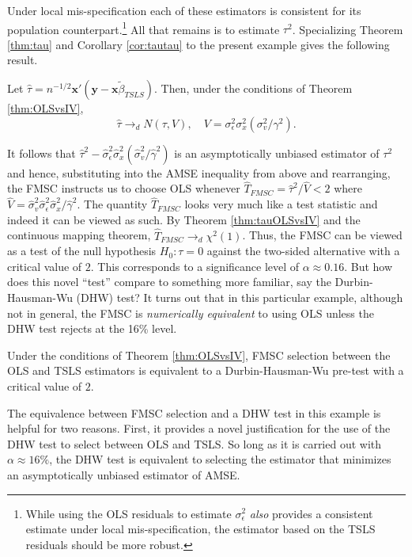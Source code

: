 Under local mis-specification each of these estimators is consistent for its population counterpart.\footnote{While using the OLS residuals to estimate $\sigma_\epsilon^2$ \emph{also} provides a consistent estimate under local mis-specification, the estimator based on the TSLS residuals should be more robust.} 
All that remains is to estimate $\tau^2$. Specializing Theorem \ref{thm:tau} and Corollary \ref{cor:tautau} to the present example gives the following result.
\begin{thm}
	\label{thm:tauOLSvsIV}
	Let $\widehat{\tau} =  n^{-1/2} \mathbf{x}'(\mathbf{y} - \mathbf{x}\widetilde{\beta}_{TSLS})$. Then, under the conditions of Theorem \ref{thm:OLSvsIV},
	$$\widehat{\tau}\rightarrow_d N(\tau,V), \quad V = \sigma_\epsilon^2 \sigma_x^2(\sigma_v^2/\gamma^2).$$ 
\end{thm}
It follows that $\widehat{\tau}^2 -  \widehat{\sigma}_\epsilon^2\widehat{\sigma}_x^2 \left(\widehat{\sigma}_v^2/\widehat{\gamma}^2\right)$ is an asymptotically unbiased estimator of $\tau^2$ and hence, substituting into the AMSE inequality from above and rearranging, the FMSC instructs us to choose OLS whenever $\widehat{T}_{FMSC} = \widehat{\tau}^2/\widehat{V} < 2$
where $\widehat{V} = \widehat{\sigma}_v^2 \widehat{\sigma}_\epsilon^2 \widehat{\sigma}_x^2/\widehat{\gamma}^2$. 
The quantity $\widehat{T}_{FMSC}$ looks very much like a test statistic and indeed it can be viewed as such. 
By Theorem \ref{thm:tauOLSvsIV} and the continuous mapping theorem, $\widehat{T}_{FMSC} \rightarrow_d \chi^2(1)$. 
Thus, the FMSC can be viewed as a test of the null hypothesis $H_0\colon \tau = 0$ against the two-sided alternative with a critical value of $2$. 
This corresponds to a significance level of $\alpha \approx 0.16$. 
But how does this novel ``test'' compare to something more familiar, say the Durbin-Hausman-Wu (DHW) test? 
It turns out that in this particular example, although not in general, the FMSC is \emph{numerically equivalent} to using OLS unless the DHW test rejects at the 16\% level. 
\begin{thm}
    \label{thm:DHW} Under the conditions of Theorem \ref{thm:OLSvsIV}, FMSC selection between the OLS and TSLS estimators is equivalent to a Durbin-Hausman-Wu pre-test with a critical value of $2$.
\end{thm}
The equivalence between FMSC selection and a DHW test in this example is helpful for two reasons. 
First, it provides a novel justification for the use of the DHW test to select between OLS and TSLS. So long as it is carried out with $\alpha \approx 16\%$, the DHW test is equivalent to selecting the estimator that minimizes an asymptotically unbiased estimator of AMSE. 
